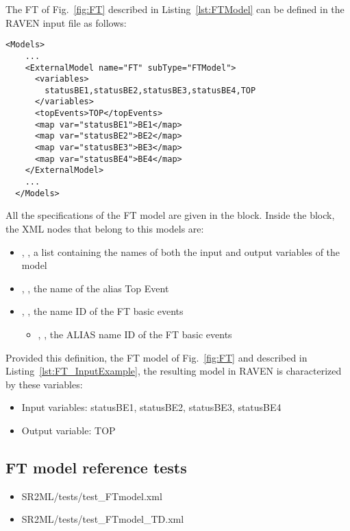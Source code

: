 The FT of Fig.~\ref{fig:FT} described in Listing~\ref{lst:FTModel} can be defined in the RAVEN input file as follows:

\begin{lstlisting}[style=XML,morekeywords={anAttribute},caption=FT model input example., label=lst:FT_InputExample]
  <Models>
    ...
    <ExternalModel name="FT" subType="FTModel">
      <variables>
        statusBE1,statusBE2,statusBE3,statusBE4,TOP
      </variables>
      <topEvents>TOP</topEvents>
      <map var="statusBE1">BE1</map>
      <map var="statusBE2">BE2</map>
      <map var="statusBE3">BE3</map>
      <map var="statusBE4">BE4</map>
    </ExternalModel>
    ...
  </Models>
\end{lstlisting}

All the specifications of the FT model are given in the
 block.
Inside the  block, the XML
nodes that belong to this models are:
\begin{itemize}
  \item  {}, , a list containing the names of both the input and output variables of the model
  \item  {}, , the name of the alias Top Event
  \item  {}, , the name ID of the FT basic events
	  \begin{itemize}
	    \item {}, , the ALIAS name ID of the FT basic events
	  \end{itemize}
\end{itemize}

Provided this definition, the FT model of Fig.~\ref{fig:FT} and described in Listing~\ref{lst:FT_InputExample},
the resulting model in RAVEN is characterized by these variables:
\begin{itemize}
	\item Input variables: statusBE1, statusBE2, statusBE3, statusBE4
	\item Output variable: TOP
\end{itemize}

\subsection{FT model reference tests}
\begin{itemize}
	\item SR2ML/tests/test\_FTmodel.xml
	\item SR2ML/tests/test\_FTmodel\_TD.xml
\end{itemize}
